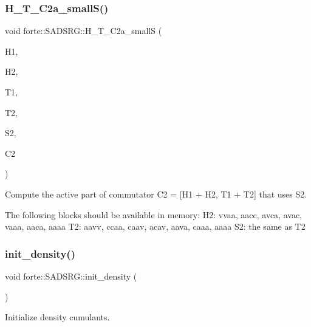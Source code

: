 \subsubsection{\texorpdfstring{H\+\_\+\+T\+\_\+\+C2a\+\_\+small\+S()}{H\_T\_C2a\_smallS()}}
{\footnotesize\ttfamily void forte\+::\+S\+A\+D\+S\+R\+G\+::\+H\+\_\+\+T\+\_\+\+C2a\+\_\+smallS (\begin{DoxyParamCaption}\item[{Blocked\+Tensor \&}]{H1,  }\item[{Blocked\+Tensor \&}]{H2,  }\item[{Blocked\+Tensor \&}]{T1,  }\item[{Blocked\+Tensor \&}]{T2,  }\item[{Blocked\+Tensor \&}]{S2,  }\item[{Blocked\+Tensor \&}]{C2 }\end{DoxyParamCaption})\hspace{0.3cm}{\ttfamily [protected]}}



Compute the active part of commutator C2 = \mbox{[}H1 + H2, T1 + T2\mbox{]} that uses S2. 

The following blocks should be available in memory\+: H2\+: vvaa, aacc, avca, avac, vaaa, aaca, aaaa T2\+: aavv, ccaa, caav, acav, aava, caaa, aaaa S2\+: the same as T2\mbox{\label{classforte_1_1_s_a_d_s_r_g_a05d2da19a1410e1e50d887b5e9fcc1fe}} 
\subsubsection{\texorpdfstring{init\+\_\+density()}{init\_density()}}
{\footnotesize\ttfamily void forte\+::\+S\+A\+D\+S\+R\+G\+::init\+\_\+density (\begin{DoxyParamCaption}{ }\end{DoxyParamCaption})\hspace{0.3cm}{\ttfamily [protected]}}



Initialize density cumulants. 

\mbox{\label{classforte_1_1_s_a_d_s_r_g_a174c0908b6d5b6b81d5f88b6a7dbe683}} 
